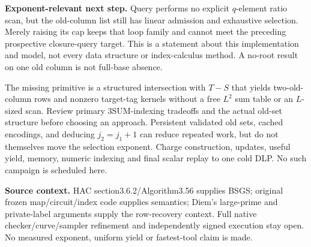 \documentclass[10pt]{article}
\begin{document}
\textbf{Exponent-relevant next step.} Query performs no explicit $q$-element
ratio scan, but the old-column list still has linear admission and exhaustive
selection. Merely raising its cap keeps that loop family and cannot meet
the preceding prospective closure-query target. This is a statement about
this implementation and model, not every data structure or index-calculus
method. A no-root result on one old column is not full-base absence.

The missing primitive is a structured intersection with $T-S$ that yields
two-old-column rows and nonzero target-tag kernels without a free $L^2$ sum
table or an $L$-sized scan. Review primary 3SUM-indexing tradeoffs and the
actual old-set structure before choosing an approach. Persistent validated
old sets, cached encodings, and deducing $j_2=j_1+1$ can reduce repeated work,
but do not themselves move the selection exponent. Charge construction,
updates, useful yield, memory, numeric indexing and final scalar replay to
one cold DLP. No such campaign is scheduled here.

\textbf{Source context.} HAC section3.6.2/Algorithm3.56 supplies BSGS;
original frozen map/circuit/index code supplies semantics; Diem's large-prime
and private-label arguments supply the row-recovery context. Full native
checker/curve/sampler refinement and independently signed execution stay
open. No measured exponent, uniform yield or fastest-tool claim is made.
\end{document}
